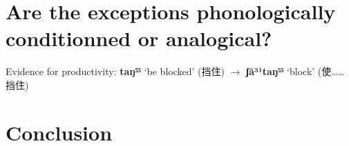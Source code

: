 \documentclass[oneside,a4paper,11pt]{article}
\newcommand{\ipa}[1]{{\phon\textbf{#1}}}
\newcommand{\zh}[1]{{\cn #1}}
\begin{document}
\section{Are the exceptions phonologically conditionned or analogical?}


Evidence for productivity: 
\ipa{taŋ⁵⁵} `be blocked' (\zh{挡住}) $\rightarrow$ \ipa{ʃă³¹taŋ⁵⁵} `block' (\zh{使……挡住})

\citet{dai90yufa} \citet{kurabe16jinghpo}


\section*{Conclusion}



 
\end{document}
